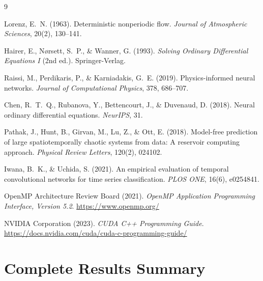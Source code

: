 \documentclass[11pt,a4paper]{article}
\begin{document}

\begin{thebibliography}{9}

Lorenz, E.~N. (1963).
\newblock Deterministic nonperiodic flow.
\newblock \textit{Journal of Atmospheric Sciences}, 20(2), 130--141.

Hairer, E., N{\o}rsett, S.~P., \& Wanner, G. (1993).
\newblock \textit{Solving Ordinary Differential Equations I} (2nd ed.).
\newblock Springer-Verlag.

Raissi, M., Perdikaris, P., \& Karniadakis, G.~E. (2019).
\newblock Physics-informed neural networks.
\newblock \textit{Journal of Computational Physics}, 378, 686--707.

Chen, R.~T.~Q., Rubanova, Y., Bettencourt, J., \& Duvenaud, D. (2018).
\newblock Neural ordinary differential equations.
\newblock \textit{NeurIPS}, 31.

Pathak, J., Hunt, B., Girvan, M., Lu, Z., \& Ott, E. (2018).
\newblock Model-free prediction of large spatiotemporally chaotic systems from
  data: A reservoir computing approach.
\newblock \textit{Physical Review Letters}, 120(2), 024102.

Iwana, B.~K., \& Uchida, S. (2021).
\newblock An empirical evaluation of temporal convolutional networks for
  time series classification.
\newblock \textit{PLOS ONE}, 16(6), e0254841.

OpenMP Architecture Review Board (2021).
\newblock \textit{OpenMP Application Programming Interface, Version 5.2}.
\newblock \url{https://www.openmp.org/}

NVIDIA Corporation (2023).
\newblock \textit{CUDA C++ Programming Guide}.
\newblock \url{https://docs.nvidia.com/cuda/cuda-c-programming-guide/}

\end{thebibliography}

\appendix
\section{Complete Results Summary}
\end{document}
